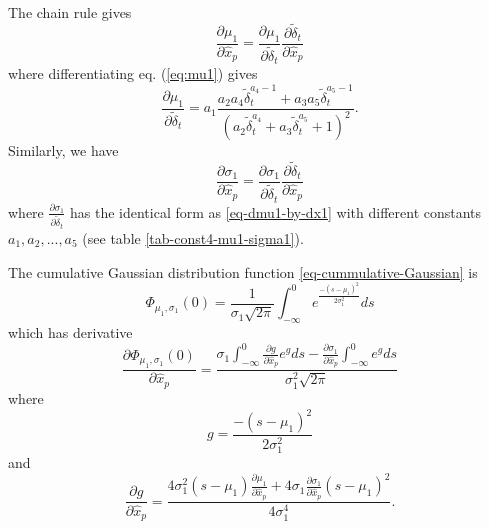\documentclass[extra]{gji}
\begin{document}
The chain rule gives
\begin{equation}
\frac{\partial \mu_1}{\partial \hat{x}_p} = \frac{\partial \mu_1}{\partial \widetilde{\delta}_t} \frac{\partial \widetilde{\delta}_t}{\partial \hat{x}_p}
\end{equation}
where differentiating eq. (\ref{eq:mu1}) gives
\begin{equation}
\label{eq-dmu1-by-dx1}
\frac{\partial \mu_1}{\partial \widetilde{\delta}_t} = a_1 \frac{a_2 a_4 \widetilde{\delta}_t^{a_4-1} +a_3 a_5 \widetilde{\delta}_t^{a_5-1}}
{\left(a_2 \widetilde{\delta}_t^{a_4} +a_3 \widetilde{\delta}_t^{a_5} +1 \right)^2}.
\end{equation}
Similarly, we have
\begin{equation}
\frac{\partial \sigma_1}{\partial \hat{x}_p} = \frac{\partial \sigma_1}{\partial \widetilde{\delta}_t} \frac{\partial \widetilde{\delta}_t}
{\partial \hat{x}_p}
\end{equation}
where $\frac{\partial \sigma_1}{\partial \widetilde{\delta}_t}$ has the identical form as \ref{eq-dmu1-by-dx1} with different constants
$a_1,a_2,...,a_5$ (see table \ref{tab-const4-mu1-sigma1}).

The cumulative Gaussian distribution function \ref{eq-cummulative-Gaussian} is
\begin{equation}
\Phi_{\mu_1,\sigma_1}(0) = \frac{1}{\sigma_1 \sqrt{2 \pi}}
\int_{-\infty}^0 e^{  \frac{-(s-\mu_1)^2}{2\sigma_1^2}  } ds
\end{equation}
which has derivative
\begin{equation}
\frac{\partial \Phi_{\mu_1,\sigma_1}(0)}{\partial \hat{x}_p} =
\frac{ \sigma_1 \int_{-\infty}^0 \frac{\partial g}{\partial \hat{x}_p} e^g ds -
\frac{\partial \sigma_1}{\partial \hat{x}_p} \int_{-\infty}^0 e^g ds}
{\sigma_1^2 \sqrt{2 \pi}}
\end{equation}
where
\begin{equation}
g = \frac{-(s-\mu_1)^2}{2 \sigma_1^2}
\end{equation}
and
\begin{equation}
\frac{\partial g}{\partial \hat{x}_p} = \frac{4 \sigma_1^2 (s-\mu_1) \frac{\partial \mu_1}{\partial \hat{x}_p}
+ 4\sigma_1 \frac{\partial \sigma_1}{\partial \hat{x}_p}(s-\mu_1)^2}
{4 \sigma_1^4}.
\end{equation}
\end{document}
